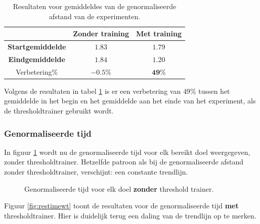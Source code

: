 \documentclass{article}
\newcommand{\figwidth}{0.85\linewidth}
\begin{document}
\begin{table}[H]
	\begin{tabular}{|c|c|c|}
		\hline  & \textbf{Zonder training} & \textbf{Met training} \\ 
		\hline \textbf{Startgemiddelde} & $1.83$ & $1.79$ \\ 
		\hline \textbf{Eindgemiddelde} & $1.84$ & $1.20$ \\ 
		\hline Verbetering\% & $\mathbf{-0.5}\%$ & $\mathbf{49}\%$\\
		\hline
	\end{tabular} 
	\caption{Resultaten voor gemiddeldes van de genormaliseerde afstand van de experimenten.}
	\label{tbl:resgemiddeldesdist}
\end{table}
Volgens de resultaten in tabel \ref{tbl:resgemiddeldesdist} is er een verbetering van $49$\% tussen het gemiddelde in het begin en het gemiddelde aan het einde van het experiment, als de thresholdtrainer gebruikt wordt.
\subsubsection*{Genormaliseerde tijd}
In figuur \ref{fig:restiment} wordt nu de genormaliseerde tijd voor elk bereikt doel weergegeven, zonder thresholdtrainer. Hetzelfde patroon als bij de genormaliseerde afstand zonder thresholdtrainer, verschijnt: een constante trendlijn.

\begin{figure}[H]
	\centering
	\caption{Genormaliseerde tijd voor elk doel \textbf{zonder} threshold trainer.}
	\label{fig:restiment}
	
\end{figure}
Figuur \ref{fig:restimewt} toont de resultaten voor de genormaliseerde tijd \textbf{met} thresholdtrainer. Hier is duidelijk terug een daling van de trendlijn op te merken.
\end{document}
